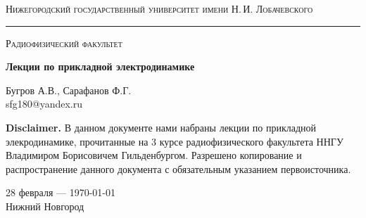 \begin{titlepage}
\thispagestyle{empty}

\begin{center}
	{\small\textsc{Нижегородский государственный университет имени Н.\,И. Лобачевского}}
	\vskip 3pt \hrule \vskip 5pt
	{\small\textsc{Радиофизический факультет}}

	\vfill

	\begin{spacing}{2}
	{\Huge \bf  Лекции по прикладной электродинамике}\\%
	\end{spacing}
	\vspace{1em}
	{\Large Бугров А.В., Сарафанов Ф.Г.}\\[2em]
	{\large sfg180@yandex.ru}\\
	\vspace{1em}
\end{center}

\textbf{Disclaimer.} В данном документе нами набраны лекции по прикладной элекродинамике, прочитанные на 3 курсе радиофизического факультета ННГУ Владимиром Борисовичем Гильденбургом. Разрешено копирование и распространение данного документа с обязательным указанием первоисточника. 

\begin{center}
	\vfill
	28 февраля --- \today\\Нижний Новгород
\end{center}

\end{titlepage}